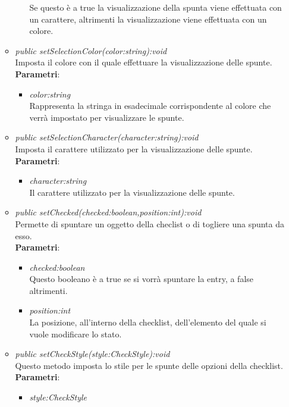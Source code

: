 \begin{itemize}
\begin{itemize}
\begin{itemize}
			Se questo è a true la visualizzazione della spunta viene effettuata con un carattere, altrimenti la visualizzazione viene effettuata con un colore.
			\end{itemize}  
	\item \textit{public setSelectionColor(color:string):void}\\
	Imposta il colore con il quale effettuare la visualizzazione delle spunte.
		\\ \textbf{Parametri}: \begin{itemize}
		\item \textit{color:string}\\
		Rappresenta la stringa in esadecimale corrispondente al colore che verrà impostato per visualizzare le spunte.
		\end{itemize}  
	\item \textit{public setSelectionCharacter(character:string):void}\\
	Imposta il carattere utilizzato per la visualizzazione delle spunte.
		\\ \textbf{Parametri}: \begin{itemize}
		\item \textit{character:string}\\
		Il carattere utilizzato per la visualizzazione delle spunte.
		\end{itemize}  
	\item \textit{public setChecked(checked:boolean,position:int):void}\\
	Permette di spuntare un oggetto della checlist o di togliere una spunta da esso.
		\\ \textbf{Parametri}: \begin{itemize}
		\item \textit{checked:boolean}\\
		Questo booleano è a true se si vorrà spuntare la entry, a false altrimenti.
		\item \textit{position:int}\\
		La posizione, all'interno della checklist, dell'elemento del quale si vuole modificare lo stato. 
		\end{itemize} 
	\item \textit{public setCheckStyle(style:CheckStyle):void}\\
	Questo metodo imposta lo stile per le spunte delle opzioni della checklist.
		\\ \textbf{Parametri}: \begin{itemize}
		\item \textit{style:CheckStyle}\\

\end{itemize}
\end{itemize}
\end{itemize}
